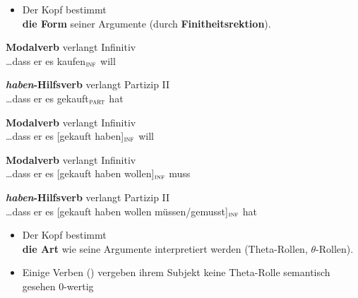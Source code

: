 \begin{frame}

\begin{itemize}
	\item Der Kopf bestimmt\\ 
	\textbf{die Form} seiner Argumente (\zB durch \textbf{Finitheitsrektion}).
\end{itemize}

\ea \textbf{Modalverb} verlangt Infinitiv\\
\dots dass er es \alert{kaufen$_{\textsc{inf}}$ will}
\z

\pause

\ea \textbf{\emph{haben}-Hilfsverb} verlangt Partizip II\\
\dots dass er es \alert{gekauft$_{\textsc{part}}$ hat}
\z

\pause

\ea \textbf{Modalverb} verlangt Infinitiv\\
\dots dass er es \alert{[gekauft haben]$_{\textsc{inf}}$ will}
\z

\pause

\ea \textbf{Modalverb} verlangt Infinitiv\\
\dots dass er es \alert{[gekauft haben wollen]$_{\textsc{inf}}$ muss}
\z

\pause

\ea \textbf{\emph{haben}-Hilfsverb} verlangt Partizip II\\
\dots dass er es \alert{[gekauft haben wollen müssen/gemusst]$_{\textsc{inf}}$ hat}
\z

\end{frame}


\begin{frame}

\begin{itemize}
	\item Der Kopf bestimmt\\ 
	\textbf{die Art} wie seine Argumente interpretiert werden (Theta-Rollen, $\theta$-Rollen).

\eal 
{}
\zl

\eal
{}
\zl


	\item Einige Verben (\zB {}) vergeben ihrem Subjekt keine Theta-Rolle \ras semantisch gesehen 0-wertig

\end{itemize}

\end{frame}


